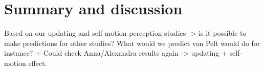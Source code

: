 \chapter{Summary and discussion}

Based on our updating and self-motion perception studies -> is it possible to make predictions for other studies?
What would we predict van Pelt would do for instance?
+
Could check Anna/Alexandra results again -> updating + self-motion effect.
